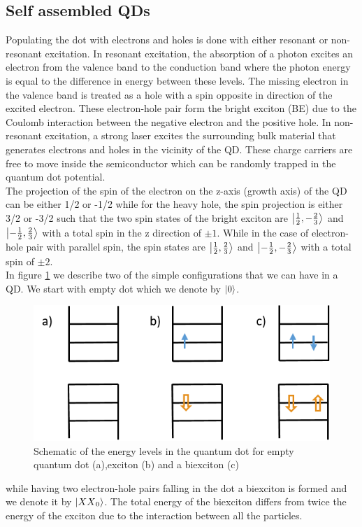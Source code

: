   	\subsection{Self assembled QDs}

	Populating the dot with electrons and holes is done with either resonant or non-resonant excitation. In resonant excitation, the absorption of a photon excites an electron from the valence band to the conduction band where the photon energy is equal to the difference in energy between these levels. The missing electron in the valence band is treated as a hole with a spin opposite in direction of the excited electron. These electron-hole pair form the bright exciton (BE) due to the Coulomb interaction between the negative electron and the positive hole. In non-resonant excitation, a strong laser excites the surrounding bulk material that generates electrons and holes in the vicinity of the QD. These charge carriers are free to move inside the semiconductor which can  be randomly trapped in the quantum dot potential. \\
	The projection of the spin of the electron on the z-axis (growth axis) of the QD can be either 1/2 or -1/2 while for the heavy hole, the spin 
 projection is either 3/2 or -3/2 such that the two spin states of the bright exciton are $\ket{\frac{1}{2},-\frac{2}{3}}$ and $\ket{-\frac{1}
 {2},\frac{2}{3}}$  with a total spin in the z direction  of $\pm1$. While in the case of electron-hole pair with parallel spin, the spin states are $\ket{\frac{1}{2},\frac{2}{3}}$ and $\ket{-\frac{1}{2},-\frac{2}{3}}$ with a total spin of $\pm2$.\\
	In figure \ref{fig:energy_levels} we describe two of the simple configurations that we can have in a QD. We start with empty dot which we denote by $\ket{0}$.
	\begin{figure}[H]
		\centering
		\includegraphics[scale=1]{figures/energy-levels.png}
		\caption{Schematic of the energy levels in the quantum dot for empty quantum dot (a),exciton (b) and a biexciton (c)}
		\label{fig:energy_levels}
	\end{figure}
	while having two electron-hole pairs falling in the dot a biexciton is formed and we denote it by $\ket{{XX}_0}$. The total energy of the biexciton differs from twice the energy of the exciton due to the interaction between all the particles.\\
	
